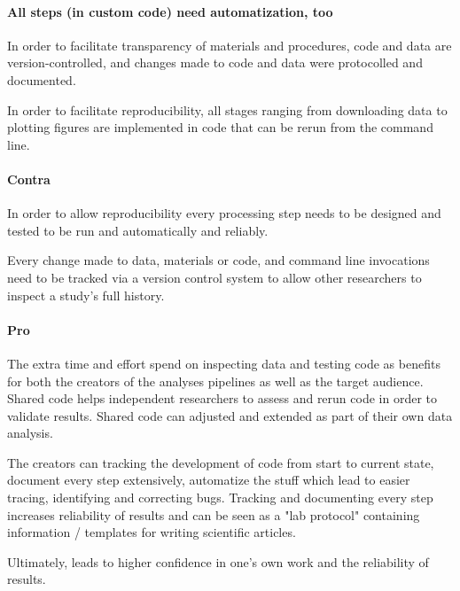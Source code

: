 \paragraph{All steps (in custom code) need automatization, too}

In order to facilitate transparency of materials and procedures, code and data
are version-controlled, and changes made to code and data were protocolled and
documented.

In order to facilitate reproducibility, all stages ranging from downloading data
to plotting figures are implemented in code that can be rerun from the command
line.


\paragraph{Contra}

%
In order to allow reproducibility every processing step needs to be designed and
tested to be run and automatically and reliably.

%
Every change made to data, materials or code, and command line invocations need
to be tracked via a version control system \citep[e.g.,][]{halchenko2021datalad}
to allow other researchers to inspect a study's full history.


\paragraph{Pro}


The extra time and effort spend on inspecting data and testing code as benefits
for both the creators of the analyses pipelines as well as the target audience.
%
Shared code helps independent researchers to assess and rerun code in order to
validate results.
%
Shared code can adjusted and extended  as part of their own data analysis.

%
The creators can tracking the development of code from start to current state,
document every step extensively, automatize the stuff which lead to easier
tracing, identifying and correcting bugs.
%
Tracking and documenting every step increases reliability of results and can be
seen as a "lab protocol" containing information / templates for writing
scientific articles.

%
Ultimately, leads to higher confidence in one's own work and the reliability of
results.

